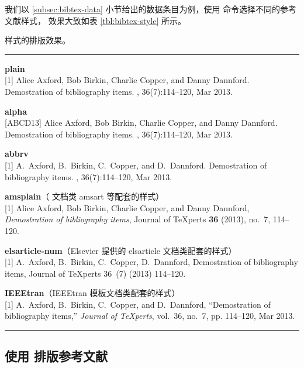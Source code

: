 我们以 \ref{subsec:bibtex-data} 小节给出的数据条目为例，使用  命令选择不同的参考文献样式，
效果大致如表 \ref{tbl:bibtex-style} 所示。

\begin{table}[htp]
\caption{ 样式的排版效果。}\label{tbl:bibtex-style}
\hrule
\begin{trivlist}\item\relax
\textbf{plain}\\{}
[1] Alice Axford, Bob Birkin, Charlie Copper, and Danny Dannford.
\newblock Demostration of bibliography items.
, 36(7):114--120, Mar 2013.

\medskip
\textbf{alpha}\\{}
[ABCD13] Alice Axford, Bob Birkin, Charlie Copper, and Danny Dannford.
\newblock Demostration of bibliography items.
, 36(7):114--120, Mar 2013.

\medskip
\textbf{abbrv}\\{}
[1] A.~Axford, B.~Birkin, C.~Copper, and D.~Dannford.
\newblock Demostration of bibliography items.
, 36(7):114--120, Mar 2013.

\medskip
\textbf{amsplain}（\AmS{} 文档类 \textsf{amsart} 等配套的样式）\\{}
[1] Alice Axford, Bob Birkin, Charlie Copper, and Danny Dannford, \emph{Demostration of bibliography
  items}, Journal of \TeX perts \textbf{36} (2013), no.~7, 114--120.

\medskip
\textbf{elsarticle-num}（Elsevier 提供的 \textsf{elsarticle} 文档类配套的样式）\\{}
[1] A.~Axford, B.~Birkin, C.~Copper, D.~Dannford, Demostration of bibliography items,
  Journal of \TeX perts 36~(7) (2013) 114--120.

\medskip
\textbf{IEEEtran}（\textsf{IEEEtran} 模板文档类配套的样式）\\{}
[1] A.~Axford, B.~Birkin, C.~Copper, and D.~Dannford, ``Demostration of
  bibliography items,'' \emph{Journal of \TeX perts}, vol.~36, no.~7, pp.
  114--120, Mar 2013.
\end{trivlist}
\hrule
\end{table}

\subsection{使用  排版参考文献}\label{subsec:bibtex-use}

